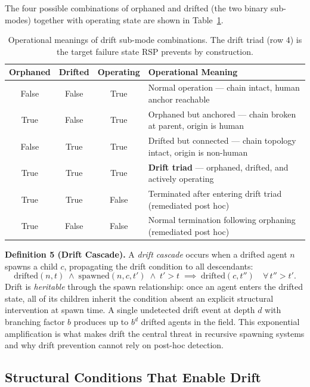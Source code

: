 \documentclass[12pt]{article}
\begin{document}
The four possible combinations of orphaned and drifted (the two binary sub-modes) together with operating state are shown in Table~\ref{tab:drift-submodes}.

\begin{table}[h]
\centering
\begin{tabular}{c|c|c|p{5.2cm}}
\textbf{Orphaned} & \textbf{Drifted} & \textbf{Operating} & \textbf{Operational Meaning} \\ \hline
False & False & True  & Normal operation — chain intact, human anchor reachable \\
True  & False & True  & Orphaned but anchored — chain broken at parent, origin is human \\
False & True  & True  & Drifted but connected — chain topology intact, origin is non-human \\
True  & True  & True  & \textbf{Drift triad} — orphaned, drifted, and actively operating \\
True  & True  & False & Terminated after entering drift triad (remediated post hoc) \\
True  & False & False & Normal termination following orphaning (remediated post hoc)
\end{tabular}
\caption{Operational meanings of drift sub-mode combinations. The drift triad (row 4) is the target failure state RSP prevents by construction.}
\label{tab:drift-submodes}
\end{table}

\medskip
\noindent\textbf{Definition 5 (Drift Cascade).}
A \emph{drift cascade} occurs when a drifted agent $n$ spawns a child $c$, propagating the drift condition to all descendants:
\begin{equation}
\text{drifted}(n, t) \;\land\; \text{spawned}(n, c, t') \;\land\; t' > t \;\implies\; \text{drifted}(c, t'') \quad \forall\, t'' > t'.
\label{eq:drift-cascade}
\end{equation}
Drift is \emph{heritable} through the spawn relationship: once an agent enters the drifted state, all of its children inherit the condition absent an explicit structural intervention at spawn time. A single undetected drift event at depth $d$ with branching factor $b$ produces up to $b^d$ drifted agents in the field. This exponential amplification is what makes drift the central threat in recursive spawning systems and why drift prevention cannot rely on post-hoc detection.

\subsection{Structural Conditions That Enable Drift}
\label{sec:drift-conditions}
\end{document}
